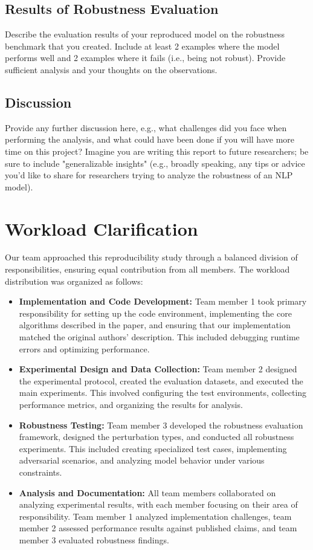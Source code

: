\documentclass[11pt,a4paper]{article}
\begin{document}
\subsection{Results of Robustness Evaluation}
Describe the evaluation results of your reproduced model on the robustness benchmark that you created. Include at least 2 examples where the model performs well and 2 examples where it fails (i.e., being not robust). Provide sufficient analysis and your thoughts on the observations.

\subsection{Discussion} 
Provide any further discussion here, e.g., what challenges did you face when performing the analysis, and what could have been done if you will have more time on this project? Imagine you are writing this report to future researchers; be sure to include "generalizable insights" (e.g., broadly speaking, any tips or advice you'd like to share for researchers trying to analyze the robustness of an NLP model).

\section{Workload Clarification}

Our team approached this reproducibility study through a balanced division of responsibilities, ensuring equal contribution from all members. The workload distribution was organized as follows:

\begin{itemize}
    \item \textbf{Implementation and Code Development:} Team member 1 took primary responsibility for setting up the code environment, implementing the core algorithms described in the paper, and ensuring that our implementation matched the original authors' description. This included debugging runtime errors and optimizing performance.
    
    \item \textbf{Experimental Design and Data Collection:} Team member 2 designed the experimental protocol, created the evaluation datasets, and executed the main experiments. This involved configuring the test environments, collecting performance metrics, and organizing the results for analysis.
    
    \item \textbf{Robustness Testing:} Team member 3 developed the robustness evaluation framework, designed the perturbation types, and conducted all robustness experiments. This included creating specialized test cases, implementing adversarial scenarios, and analyzing model behavior under various constraints.
    
    \item \textbf{Analysis and Documentation:} All team members collaborated on analyzing experimental results, with each member focusing on their area of responsibility. Team member 1 analyzed implementation challenges, team member 2 assessed performance results against published claims, and team member 3 evaluated robustness findings.
\end{itemize}
\end{document}
